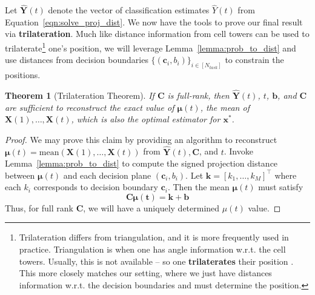 \documentclass[12pt]{article}
\newtheorem{theorem}{Theorem}
\begin{document}
Let $\hat{\mathbf Y}(t)$ denote the vector of classification estimates $\hat Y(t)$ from Equation~\ref{eqn:solve_proj_dist}. We now have the tools to prove our final result via \textbf{trilateration}. Much like distance information from cell towers can be used to trilaterate\footnote{Trilateration differs from triangulation, and it is more frequently used in practice. Triangulation is when one has angle information w.r.t. the cell towers. Usually, this is not available -- so one \textbf{trilaterates} their position \cite{oguejiofor2013trilateration}. This more closely matches our setting, where we just have distances information w.r.t. the decision boundaries and must determine the position.} one's position, we will leverage Lemma~\ref{lemma:prob_to_dist} and use distances from decision boundaries $\{(\mathbf c_i, b_i)\}_{i\in [N_{task}]}$ to constrain the positions.

\begin{theorem}[Trilateration Theorem]
	\label{thm:main}
	If $\mathbf C$ is full-rank, then $\hat{\mathbf Y}(t)$, $t$, $\mathbf b$, and $\mathbf C$ are sufficient to reconstruct the exact value of $\mathbf \mu(t)$, the mean of $\mathbf X(1), \dots, \mathbf X(t)$, which is also the optimal estimator for $\mathbf x^*$. 
\end{theorem}
\begin{proof}
	We may prove this claim by providing an algorithm to reconstruct $\mathbf \mu(t) = \text{mean}(\mathbf X(1), \dots, \mathbf X(t))$ from $\hat{\mathbf Y}(t), \mathbf C$, and $t$.
	Invoke Lemma~\ref{lemma:prob_to_dist} to compute the signed projection distance between $\mathbf \mu(t)$ and each decision plane $(\mathbf c_i, b_i)$.
	Let $\mathbf k = [k_1, \dots, k_M]^\top$ where each $k_i$ corresponds to decision boundary $\mathbf c_i$.
    Then the mean $\mathbf \mu(t)$ must satisfy 
	\begin{equation}
		\label{eqn:final_lin_sys}
		\mathbf {C \mu(t)} = \mathbf k + \mathbf b 
	\end{equation}
	Thus, for full rank $\mathbf C$, we will have a uniquely determined $\mu(t)$ value. 
\end{proof}
\end{document}
